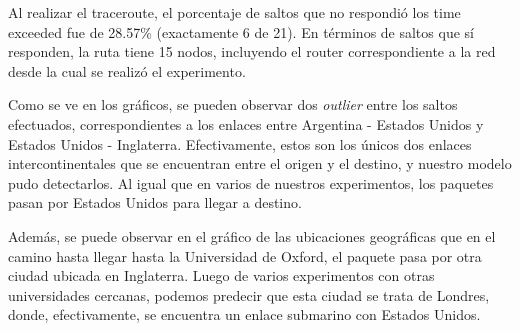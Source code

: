 Al realizar el traceroute, el porcentaje de saltos que no respondió los time exceeded fue de 28.57\% (exactamente 6 de 21). En términos de saltos que sí responden, la ruta tiene 15 nodos, incluyendo el router correspondiente a la red desde la cual se realizó el experimento.

Como se ve en los gráficos, se pueden observar dos \textit{outlier} entre los saltos efectuados, correspondientes a los enlaces entre Argentina - Estados Unidos y Estados Unidos - Inglaterra. Efectivamente, estos son los únicos dos enlaces intercontinentales que se encuentran entre el origen y el destino, y nuestro modelo pudo detectarlos. Al igual que en varios de nuestros experimentos, los paquetes pasan por Estados Unidos para llegar a destino.

Además, se puede observar en el gráfico de las ubicaciones geográficas que en el camino hasta llegar hasta la Universidad de Oxford, el paquete pasa por otra ciudad ubicada en Inglaterra. Luego de varios experimentos con otras universidades cercanas, podemos predecir que esta ciudad se trata de Londres, donde, efectivamente, se encuentra un enlace submarino con Estados Unidos.
